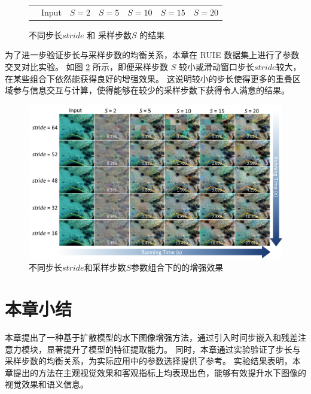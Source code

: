 \begin{figure}[ht]
\begin{center}
\begin{tabular}{ccccccc}
            \multicolumn{1}{c}{} & \small Input & \hspace{-0.36cm} \small $S=2$ & \hspace{-0.36cm} \small $S=5$ & \hspace{-0.36cm} \small $S=10$ & \hspace{-0.36cm} \small $S=15$ & \hspace{-0.36cm} \small $S=20$ \\
        \end{tabular}
    \end{center}
    \vspace{-6mm}
    \caption{\label{img:stride-S} 不同步长$stride$ 和 采样步数$S$ 的结果}
    \vspace{-4mm}
\end{figure}

为了进一步验证步长与采样步数的均衡关系，本章在 RUIE \cite{RUIE} 数据集上进行了参数交叉对比实验。
如图 \ref{img:param} 所示，即便采样步数 $S$ 较小或滑动窗口步长$stride$较大，在某些组合下依然能获得良好的增强效果。
这说明较小的步长使得更多的重叠区域参与信息交互与计算，使得能够在较少的采样步数下获得令人满意的结果。
\begin{figure}[t]
    \centering
    \includegraphics[width=0.98\linewidth]{figures/ch3/compare/discussion/param.pdf}
    \caption{\label{img:param}不同步长$stride$和采样步数$S$参数组合下的的增强效果}
\end{figure}

\section{本章小结}
本章提出了一种基于扩散模型的水下图像增强方法，通过引入时间步嵌入和残差注意力模块，显著提升了模型的特征提取能力。
同时，本章通过实验验证了步长与采样步数的均衡关系，为实际应用中的参数选择提供了参考。
实验结果表明，本章提出的方法在主观视觉效果和客观指标上均表现出色，能够有效提升水下图像的视觉效果和语义信息。



